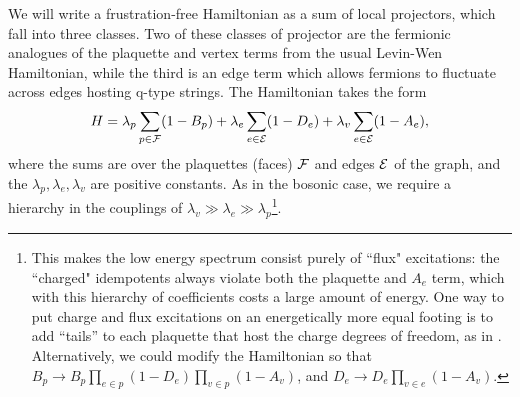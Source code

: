 We will write a frustration-free Hamiltonian as a sum of local projectors, which fall into
three classes.
Two of these classes of projector are the fermionic analogues of the plaquette and vertex terms from the usual Levin-Wen Hamiltonian, 
while the third is an edge term which allows fermions to fluctuate across edges hosting q-type strings.
The Hamiltonian takes the form
\begin{align} \label{ham}
H = \lambda_p \sum_{p \in \mathcal{F}} (1-B_p) + \lambda_e \sum_{e \in \mathcal{E}} (1-D_e) + \lambda_v \sum_{e \in \mathcal{E}} (1-A_e),
\end{align}
where the sums are over the plaquettes (faces) $\mathcal{F}$ and edges $\mathcal{E}$ of the graph, 
and the $\lambda_p,\lambda_e,\lambda_v$ are positive constants.
As in the bosonic case, we require a hierarchy in the couplings of $\lambda_v \gg \lambda_e \gg \lambda_p$\footnote{This makes the low energy spectrum consist purely of ``flux" excitations: 
the ``charged" idempotents always violate both the plaquette and $A_e$ term, which with this hierarchy of coefficients costs a large amount of energy. 
One way to put charge and flux excitations on an energetically more equal footing is to add ``tails'' to each 
plaquette that host the charge degrees of freedom, as in \cite{Hu2015}.
Alternatively, we could modify the Hamiltonian so that $B_p \rightarrow B_p \prod_{e \in p} (1-D_e) \prod_{v \in p} (1-A_v)$, and $D_e \rightarrow D_e \prod_{v \in e} (1-A_v)$.
}.
